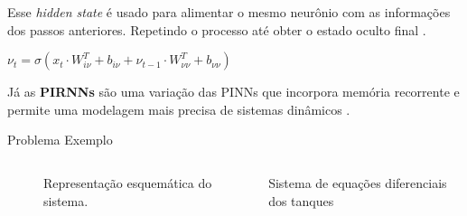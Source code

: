 \begin{frame}
  Esse \textit{hidden state} é usado para alimentar o mesmo neurônio com as informações dos passos anteriores. Repetindo o processo até obter o estado oculto final \parencite{pytorch_2024}.

  \vspace{0.4cm}

  \begin{center}
    \begin{minipage}{0.65\textwidth}
      \begin{block}{}
        \centering
        \Large
        $\nu_t = \sigma(x_t \cdot W_{i\nu}^T + b_{i\nu} + \nu_{t-1} \cdot W_{\nu\nu}^T + b_{\nu\nu})$
      \end{block}
    \end{minipage}
  \end{center}

  \vspace{0.4cm}

  Já as \textbf{PIRNNs} são uma variação das PINNs que incorpora memória recorrente e permite uma modelagem mais precisa de sistemas dinâmicos \parencite{zheng_2023}.
\end{frame}

\begin{frame}{Problema Exemplo}
  \begin{columns}
    \begin{figure}
      \centering
      \caption{Representação esquemática do sistema.}
      \label{fig:tank-system}
    \end{figure}

    \begin{block}{Sistema de equações diferenciais dos tanques}
      
      \vspace{0cm}
    \end{block}

  \end{columns}
\end{frame}

\begin{frame}
  
\end{frame}
